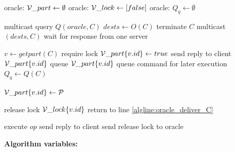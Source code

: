 \begin{algorithm}
\small
\begin{distribalgo}[1]
\vspace{1mm}

    \STATE  oracle: $\mathcal{V}\_part \leftarrow \emptyset$
    \STATE  oracle: $\mathcal{V}\_lock \leftarrow [false]$
    \STATE  oracle: $Q_q \leftarrow \emptyset$
\ENDINDENT

\vspace{1.5mm}

	\STATE multicast query $Q(oracle, C)$ \label{algline:query_oracle} 
    \STATE $dests \leftarrow O(C)$ \label{algline:oracle_response} 
    	\STATE terminate $C$ \label{algline:cli_terminate}
    \ELSE
    	\STATE multicast$(dests, C)$ \label{algline:cli_mcast}
    	\STATE wait for response from one server
    \ENDIF
\ENDINDENT

\vspace{1.5mm}

	 \label{algline:oracle_deliver_C} 
		\STATE $v \leftarrow get part(C)$
			\IF {}
				\STATE require lock  $\mathcal{V}\_part\{v.id\} \leftarrow true$
				\STATE send reply to client $\mathcal{V}\_part\{v.id\}$
			\ELSE
				\STATE queue $\mathcal{V}\_part\{v.id\}$
			\ENDIF
		\ELSE
			\STATE queue command for later execution $Q_q \leftarrow Q(C)$
		\ENDIF
	\ENDINDENT

		\STATE $\mathcal{V}\_part\{v.id\} \leftarrow \mathcal{P}$
	\ENDINDENT

		\STATE release lock $\mathcal{V}\_lock\{v.id\}$
			\STATE return to line \ref{algline:oracle_deliver_C} 
		\ENDIF
	\ENDINDENT
\ENDINDENT

		\STATE execute $op$ \label{algline:executeopck}
		\STATE send reply to client \label{algline:sendreply}
		\STATE send release lock to oracle \label{algline:send_release_lock}
	\ENDINDENT
\ENDINDENT


\vspace{1.5mm}

\textbf{Algorithm variables:}


\end{distribalgo}
\end{algorithm}
